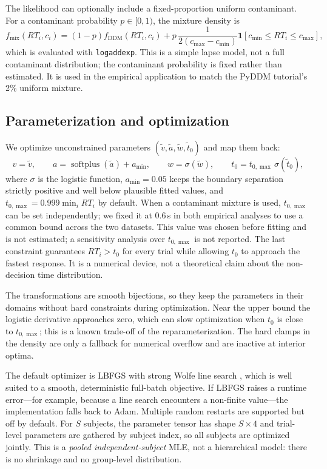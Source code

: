 \documentclass[11pt]{article}
\begin{document}
The likelihood can optionally include a fixed-proportion uniform contaminant.  For a contaminant probability $p\in[0,1)$, the mixture density is
\begin{equation}
  f_{\mathrm{mix}}(RT_i,c_i)
  =
  (1-p)f_{\mathrm{DDM}}(RT_i,c_i)
  +
  p\,\frac{1}{2(c_{\max}-c_{\min})}
  \mathbf 1[c_{\min}\le RT_i\le c_{\max}],
  \label{eq:mixture}
\end{equation}
which is evaluated with \texttt{logaddexp}.  This is a simple lapse model, not a full contaminant distribution; the contaminant probability is fixed rather than estimated.  It is used in the empirical application to match the PyDDM tutorial's 2\% uniform mixture.

\subsection{Parameterization and optimization}

We optimize unconstrained parameters $(\tilde v,\tilde a,\tilde w,\tilde t_0)$ and map them back:
\begin{equation}
  v=\tilde v,\qquad
  a=\operatorname{softplus}(\tilde a)+a_{\min},\qquad
  w=\sigma(\tilde w),\qquad
  t_0=t_{0,\max}\,\sigma(\tilde t_0),
  \label{eq:transforms}
\end{equation}
where $\sigma$ is the logistic function, $a_{\min}=0.05$ keeps the boundary separation strictly positive and well below plausible fitted values, and $t_{0,\max}=0.999\min_i RT_i$ by default.  When a contaminant mixture is used, $t_{0,\max}$ can be set independently; we fixed it at 0.6\,s in both empirical analyses to use a common bound across the two datasets.  This value was chosen before fitting and is not estimated; a sensitivity analysis over $t_{0,\max}$ is not reported.  The last constraint guarantees $RT_i>t_0$ for every trial while allowing $t_0$ to approach the fastest response. It is a numerical device, not a theoretical claim about the non-decision time distribution.

The transformations are smooth bijections, so they keep the parameters in their domains without hard constraints during optimization. Near the upper bound the logistic derivative approaches zero, which can slow optimization when $t_0$ is close to $t_{0,\max}$; this is a known trade-off of the reparameterization. The hard clamps in the density are only a fallback for numerical overflow and are inactive at interior optima.

The default optimizer is LBFGS with strong Wolfe line search \citep{NocedalWright2006}, which is well suited to a smooth, deterministic full-batch objective. If LBFGS raises a runtime error---for example, because a line search encounters a non-finite value---the implementation falls back to Adam. Multiple random restarts are supported but off by default. For $S$ subjects, the parameter tensor has shape $S\times 4$ and trial-level parameters are gathered by subject index, so all subjects are optimized jointly. This is a \emph{pooled independent-subject} MLE, not a hierarchical model: there is no shrinkage and no group-level distribution.
\end{document}
